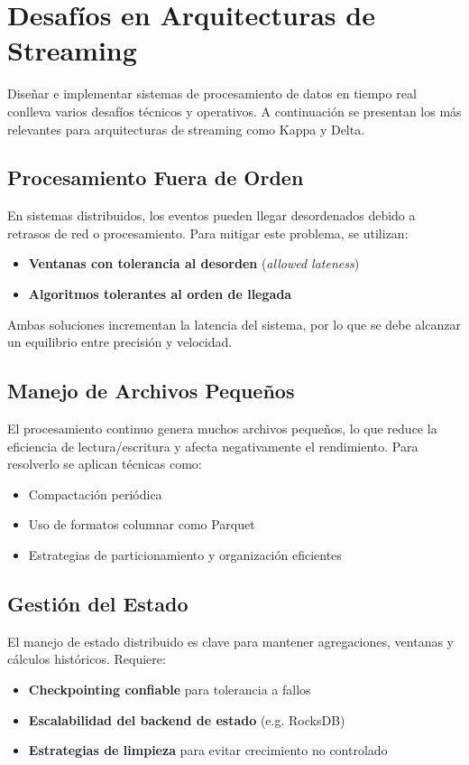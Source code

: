 \section{Desafíos en Arquitecturas de Streaming}
Diseñar e implementar sistemas de procesamiento de datos en tiempo real conlleva varios desafíos técnicos y operativos. A continuación se presentan los más relevantes para arquitecturas de streaming como Kappa y Delta.

\subsection{Procesamiento Fuera de Orden}
En sistemas distribuidos, los eventos pueden llegar desordenados debido a retrasos de red o procesamiento. Para mitigar este problema, se utilizan:
\begin{itemize}
    \item \textbf{Ventanas con tolerancia al desorden} (\textit{allowed lateness})
    \item \textbf{Algoritmos tolerantes al orden de llegada}
\end{itemize}
Ambas soluciones incrementan la latencia del sistema, por lo que se debe alcanzar un equilibrio entre precisión y velocidad.

\subsection{Manejo de Archivos Pequeños}
El procesamiento continuo genera muchos archivos pequeños, lo que reduce la eficiencia de lectura/escritura y afecta negativamente el rendimiento. Para resolverlo se aplican técnicas como:
\begin{itemize}
    \item Compactación periódica
    \item Uso de formatos columnar como Parquet
    \item Estrategias de particionamiento y organización eficientes
\end{itemize}

\subsection{Gestión del Estado}
El manejo de estado distribuido es clave para mantener agregaciones, ventanas y cálculos históricos. Requiere:
\begin{itemize}
    \item \textbf{Checkpointing confiable} para tolerancia a fallos
    \item \textbf{Escalabilidad del backend de estado} (e.g. RocksDB)
    \item \textbf{Estrategias de limpieza} para evitar crecimiento no controlado
\end{itemize}


